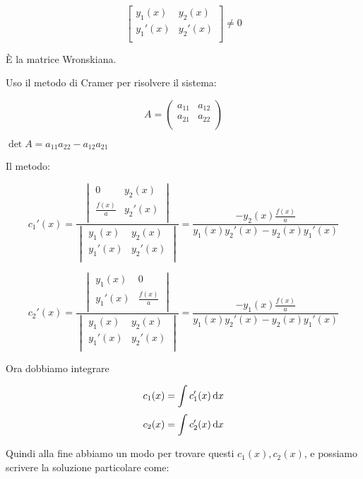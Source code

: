 \[
    \begin{bmatrix}
        y_1(x)  & y_2(x)  \\
        y_1'(x) & y_2'(x) \\
    \end{bmatrix}
    \neq 0
\]

È la matrice Wronskiana.

Uso il metodo di Cramer per risolvere il sistema:

\[
    A = \begin{pmatrix}
        a_{11} & a_{12} \\
        a_{21} & a_{22} \\
    \end{pmatrix}
\]

\(\det A = a_{11} a_{22} - a_{12} a_{21}\)

Il metodo:

\[
    c_1'(x) =
    \frac{
        \begin{vmatrix}
            0              & y_2(x)  \\
            \frac{f(x)}{a} & y_2'(x) \\
        \end{vmatrix}
    }{
        \begin{vmatrix}
            y_1(x)  & y_2(x)  \\
            y_1'(x) & y_2'(x) \\
        \end{vmatrix}
    } = \frac{- y_2(x) \frac{f(x)}{a}}{y_1(x) y_2'(x) - y_2(x) y_1'(x)}
\]

\[
    c_2'(x) =
    \frac{
        \begin{vmatrix}
            y_1(x)  & 0              \\
            y_1'(x) & \frac{f(x)}{a} \\
        \end{vmatrix}
    }{
        \begin{vmatrix}
            y_1(x)  & y_2(x)  \\
            y_1'(x) & y_2'(x) \\
        \end{vmatrix}
    } = \frac{- y_1(x) \frac{f(x)}{a}}{y_1(x) y_2'(x) - y_2(x) y_1'(x)}
\]

\filbreak{}

Ora dobbiamo integrare

\[
    c_1(x) = \int c_1'(x) \mathop{}\!\mathrm{d} x
\]
\[
    c_2(x) = \int c_2'(x) \mathop{}\!\mathrm{d} x
\]

Quindi alla fine abbiamo un modo per trovare questi \(c_1(x), c_2(x)\), e possiamo scrivere la soluzione particolare come:

